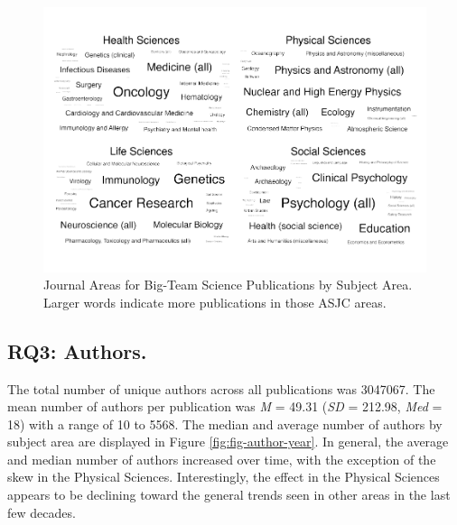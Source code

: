 \documentclass[
  man,floatsintext]{apa6}
\begin{document}
\begin{figure}
\centering
\includegraphics{manuscript_scopus_files/figure-latex/fig-clouds-1.pdf}
\caption{\label{fig:fig-clouds}Journal Areas for Big-Team Science Publications by Subject Area. Larger words indicate more publications in those ASJC areas.}
\end{figure}

\hypertarget{rq3-authors.}{%
\subsection{RQ3: Authors.}\label{rq3-authors.}}

The total number of unique authors across all publications was
3047067. The mean number of authors per publication was \emph{M} =
49.31 (\emph{SD} = 212.98, \emph{Med} = 18) with a
range of 10 to 5568. The median and average
number of authors by subject area are displayed in Figure
\ref{fig:fig-author-year}. In general, the average and median number of
authors increased over time, with the exception of the skew in the
Physical Sciences. Interestingly, the effect in the Physical Sciences
appears to be declining toward the general trends seen in other areas in
the last few decades.
\end{document}
